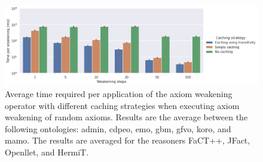 \begin{figure}[ht]
    \centering
    \includegraphics[width=\textwidth]{resources/time-cache-bar.png}
    \caption{Average time required per application of the axiom weakening operator with different caching strategies when executing axiom weakening of random axioms. Results are the average between the following ontologies: admin, cdpeo, emo, gbm, gfvo, koro, and mamo. The results are averaged for the reasoners FaCT++, JFact, Openllet, and HermiT.}
\end{figure}


